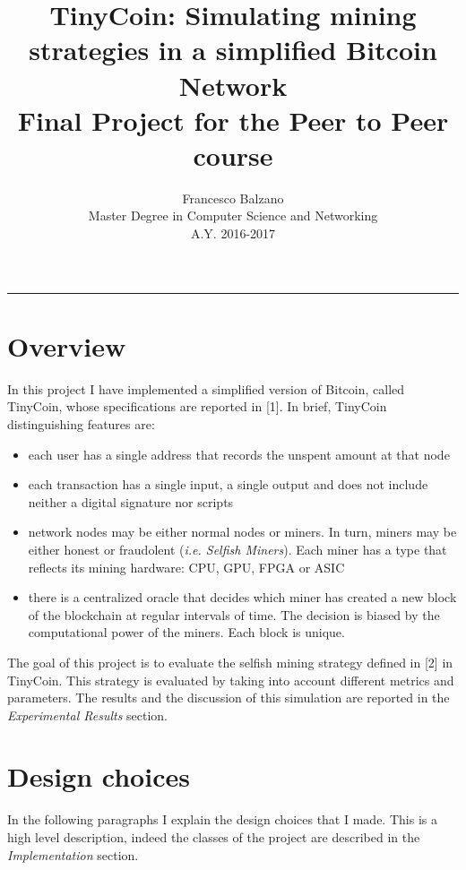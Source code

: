 \documentclass{article}
\title{ \textbf {\vspace{0.5cm}\Huge TinyCoin: Simulating mining strategies in a simplified Bitcoin Network\\ \vspace{0.5cm}}
 Final Project for the Peer to Peer course \vspace{1.0cm}\\}
\date{\vspace{1.7cm}}
\author{ \Large Francesco Balzano \vspace{0.3cm}\\ 
\Large Master Degree in Computer Science and Networking \vspace{0.4cm} \\
\Large A.Y. 2016-2017 
}
\begin{document}
  \maketitle
  \noindent\rule{18cm}{0.4pt}
  \tableofcontents
  \newpage

\clearpage
\setcounter{page}{2}
  
\section{Overview}  
In this project I have implemented a simplified version of Bitcoin, called TinyCoin, whose specifications are reported in [1]. In brief, TinyCoin distinguishing features are:
\begin{itemize}
\item each user has a single address that records the unspent amount at that node
\item each transaction has a single input, a single output and does not include neither a digital signature nor scripts
\item network nodes may be either normal nodes or miners. In turn, miners may be either honest or fraudolent (\textit{i.e. Selfish Miners}). Each miner has a type that reflects its mining hardware: CPU, GPU, FPGA or ASIC
\item there is a centralized oracle that decides which miner has created a new block of the blockchain at regular intervals of time. The decision is biased by the computational power of the miners. Each block is unique. \\
\end{itemize}
The goal of this project is to evaluate the selfish mining strategy defined in [2] in TinyCoin. This strategy is evaluated by taking into account different metrics and parameters. The results and the discussion of this simulation are reported in the \textit{Experimental Results} section.

\section{Design choices}
In the following paragraphs I explain the design choices that I made. This is a high level description, indeed the classes of the project are described in the \textit{Implementation} section.
\end{document}

